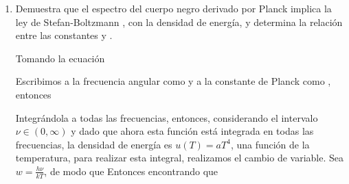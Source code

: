 \newlength{\strutheight}
\settoheight{\strutheight}{\strut}



\begin{enumerate}
  \item Demuestra que el espectro del cuerpo negro derivado por Planck 
  implica la ley de Stefan-Boltzmann , con  la densidad de energía, y determina la relación entre las constantes \ec{\hbar} y .
  
  
  
  Tomando la ecuación 
  
  Escribimos a la frecuencia angular \ec{\omega} como \ec{\omega=2\pi \nu} y a la constante de Planck como , entonces
  
  Integrándola a todas las frecuencias, entonces, considerando el intervalo $\nu\in (0,\infty)$ y dado que ahora esta función está integrada en todas las frecuencias, la densidad de energía es $u(T)=a T^4$, una función de la temperatura,
  para realizar esta integral, realizamos el cambio de variable.  Sea $w=\frac{h\nu}{k T}$, de modo que 
  Entonces
encontrando que


\end{enumerate}
